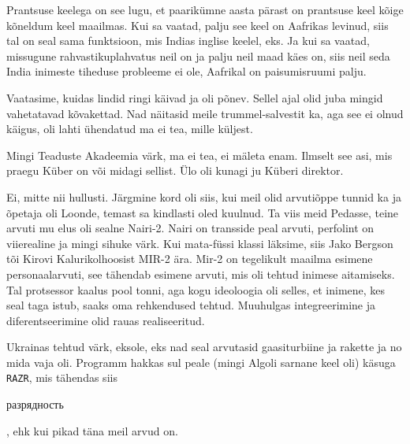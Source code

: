 
Prantsuse keelega on see lugu, et paarikümne aasta pärast on prantsuse keel 
kõige kõneldum keel maailmas. Kui sa vaatad, palju see keel on Aafrikas 
levinud, siis tal on seal sama funktsioon, mis Indias inglise keelel, eks. Ja kui sa 
vaatad, missugune  rahvastikuplahvatus neil on ja palju neil maad käes on, siis 
neil seda India inimeste tiheduse probleeme ei ole, Aafrikal on  paisumisruumi palju.
                 

Vaatasime, kuidas lindid ringi käivad ja oli põnev. Sellel ajal olid juba 
mingid vahetatavad kõvakettad. Nad näitasid meile trummel-salvestit ka, aga see 
ei olnud käigus, oli lahti ühendatud ma ei tea, mille küljest.


Mingi Teaduste Akadeemia värk, ma ei tea, ei mäleta enam. Ilmselt see asi, mis 
praegu Küber on või midagi sellist. Ülo oli kunagi ju Küberi 
direktor.


Ei, mitte nii hullusti. Järgmine kord oli siis, kui meil olid arvutiõppe tunnid 
ka ja õpetaja oli Loonde, temast sa kindlasti oled 
kuulnud. Ta viis meid Pedasse, 
teine arvuti mu elus oli sealne Nairi-2. Nairi on 
transside peal arvuti, perfolint on viierealine ja mingi sihuke värk. Kui 
mata-füssi klassi läksime, siis Jako Bergson tõi 
Kirovi Kalurikolhoosist MIR-2 
ära. Mir-2 on tegelikult maailma esimene personaalarvuti, see tähendab esimene 
arvuti, mis oli tehtud inimese aitamiseks. Tal protsessor kaalus pool 
tonni, aga kogu ideoloogia oli selles, et inimene, kes seal  taga istub, saaks 
oma rehkendused tehtud. Muuhulgas integreerimine ja diferentseerimine olid 
rauas realiseeritud.

                 
Ukrainas tehtud värk, eksole, eks nad seal arvutasid gaasiturbiine ja 
rakette ja no mida vaja oli. Programm hakkas sul peale (mingi 
Algoli sarnane keel oli) käsuga \verb|RAZR|, mis tähendas siis 
\begin{russian}разрядность\end{russian}, ehk kui pikad täna meil arvud on.

